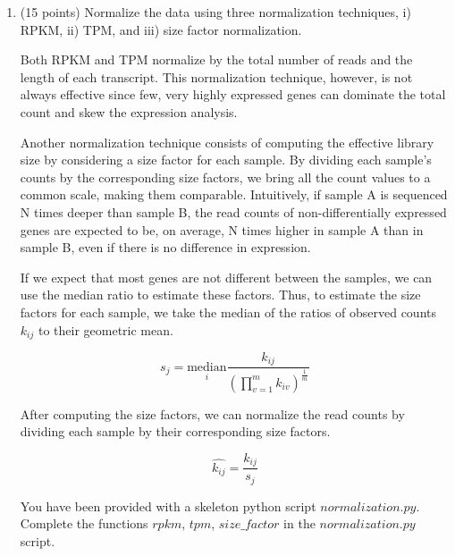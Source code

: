 \begin{enumerate}


\item (15 points) Normalize the data using three normalization techniques, i) RPKM, ii) TPM, and iii) size factor normalization. 

Both RPKM and TPM normalize by the total number of reads and the length of each transcript. This normalization technique, however, is not always effective since few, very highly expressed genes can dominate the total count and skew the expression analysis.

Another normalization technique consists of computing the effective library size by considering a size factor for each sample. By dividing each sample's counts by the corresponding size factors, we bring all the count values to a common scale, making them comparable. Intuitively, if sample A is sequenced N times deeper than sample B, the read counts of non-differentially expressed genes are expected to be, on average, N times higher in sample A than in sample B, even if there is no difference in expression.

If we expect that most genes are not different between the samples, we can use the median ratio to estimate these factors. Thus, to estimate the size factors for each sample, we take the median of the ratios of observed counts $k_{ij}$ to their geometric mean.

$$s_j=\underset{i}{\mathrm{median}} \frac{k_{ij}}{(\prod_{v=1}^{m}k_{iv})^{\frac{1}{m}}}$$


After computing the size factors, we can normalize the read counts by dividing each sample by their corresponding size factors.

$$\hat{k_{ij}}=\frac{k_{ij}}{s_j}$$ 


You have been provided with a skeleton python script $normalization.py$. 
Complete the functions $rpkm$, $tpm$, $size\_factor$  in the $normalization.py$ script.

\vspace{20pt}
 
\vspace{20pt}


\end{enumerate}
